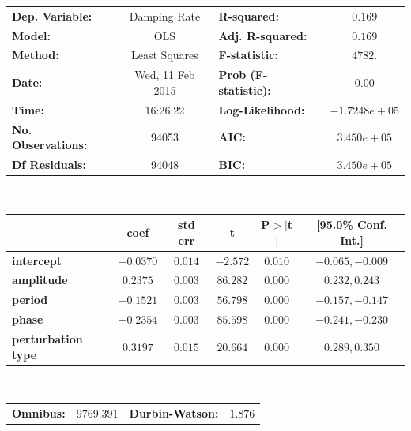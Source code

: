 \documentclass[11pt, letterpaper]{article}
\begin{document}
\begin{table}
\begin{center}
\begin{tabular}{lclc}
\toprule
\textbf{Dep. Variable:}    &      Damping Rate       & \textbf{  R-squared:         } &$     0.169  $\\
\textbf{Model:}            &       OLS        & \textbf{  Adj. R-squared:    } &$     0.169  $\\
\textbf{Method:}           &  Least Squares   & \textbf{  F-statistic:       } &$     4782.  $\\
\textbf{Date:}             & Wed, 11 Feb 2015 & \textbf{  Prob (F-statistic):} &$     0.00   $\\
\textbf{Time:}             &     16:26:22     & \textbf{  Log-Likelihood:    } &$-1.7248e+05 $\\
\textbf{No. Observations:} &       94053      & \textbf{  AIC:               } &$ 3.450e+05  $\\
\textbf{Df Residuals:}     &       94048      & \textbf{  BIC:               } &$ 3.450e+05  $\\
\bottomrule
\end{tabular}\\[5ex]
\begin{tabular}{lccccc}\toprule
                   & \textbf{coef} & \textbf{std err} & \textbf{t} & \textbf{P$>$$|$t$|$} & \textbf{[95.0\% Conf. Int.]}  \\
\midrule
\textbf{intercept}     &     $-0.0370$ &       $0.014$    &   $-2.572$ &        $0.010$       &       $-0.065,  -0.009$      \\
\textbf{amplitude} &     $ 0.2375$ &       $0.003$    &   $86.282$ &        $0.000$       &       $ 0.232,   0.243$      \\
\textbf{period}    &     $-0.1521$ &       $0.003$    &   $56.798$ &        $0.000$       &       $-0.157,  -0.147$      \\
\textbf{phase}     &     $-0.2354$ &       $0.003$    &   $85.598$ &        $0.000$       &       $-0.241,  -0.230$      \\
\textbf{perturbation type}      &     $ 0.3197$ &       $0.015$    &   $20.664$ &        $0.000$       &       $ 0.289,   0.350$      \\
\bottomrule
\end{tabular}\\[5ex]
\begin{tabular}{lclc}\toprule
\textbf{Omnibus:}       &$9769.391$& \textbf{  Durbin-Watson:     } &$    1.876$ \\

\end{tabular}
\end{center}
\end{table}
\end{document}
